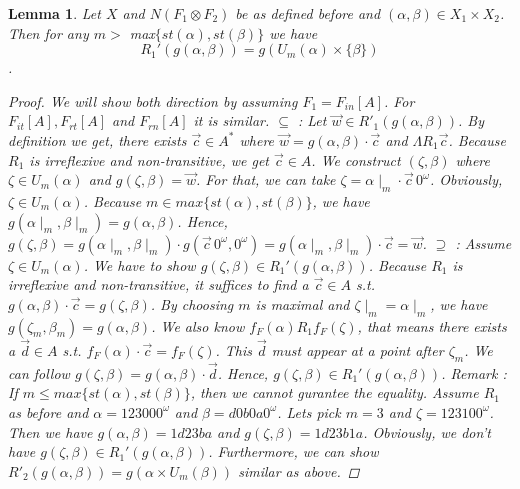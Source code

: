 \documentclass[12pt, a4paper]{scrartcl}
\newtheorem{lemma}[definition]{Lemma}
\begin{document}
\begin{lemma}
    Let $X$ and $N(F_1 \otimes F_2)$ be as defined before and $(\alpha,\beta) \in X_1 \times X_2$. Then for any $m >$ max$\{st(\alpha), st(\beta)\}$ we have 
    $$R_1'(g(\alpha,\beta)) = g(U_m(\alpha) \times \{\beta\})$$.
    

    \begin{proof}
        We will show both direction by assuming $F_1 = F_{in}[A]$. For $F_{it}[A],F_{rt}[A]$ and $F_{rn}[A]$ it is similar. \newline
        $\subseteq$ : Let $\vec{w} \in R'_1(g(\alpha,\beta))$. By definition we get, there exists $\vec{c} \in A^*$ where $\vec{w} = g(\alpha,\beta) \cdot \vec{c}$ and $\Lambda R_1 \vec{c}$.
        Because $R_1$ is irreflexive and non-transitive, we get $\vec{c} \in A$. We construct $(\zeta,\beta)$ where $\zeta \in U_m(\alpha)$ and $g(\zeta,\beta) = \vec{w}$. For that, we can take $\zeta = \alpha \mid_m \cdot \vec{c}\, 0^\omega$. Obviously, $\zeta \in U_m(\alpha)$.
        Because $m \in max\{st(\alpha), st(\beta)\}$, we have $g(\alpha \mid_m, \beta \mid_m) = g(\alpha, \beta)$. Hence, $g(\zeta, \beta) = g(\alpha \mid_m, \beta \mid_m) \cdot g(\vec{c} \,0^\omega, 0^\omega) = g(\alpha \mid_m, \beta \mid_m) \cdot \vec{c} = \vec{w}$.
        \newline \newline
        $\supseteq$ : Assume $\zeta \in U_m(\alpha)$. We have to show $g(\zeta, \beta) \in R_1'(g(\alpha, \beta))$. Because $R_1$ is irreflexive and non-transitive, it suffices to find a $\vec{c} \in A$ s.t. $g(\alpha,\beta) \cdot \vec{c} = g(\zeta, \beta)$.
        By choosing $m$ is maximal and $\zeta \mid_m = \alpha \mid_m$, we have $g(\zeta_m, \beta_m) = g(\alpha,\beta)$. We also know $f_F(\alpha)R_1 f_F(\zeta)$, that means there exists a $\vec{d} \in A$ s.t. $f_F(\alpha) \cdot \vec{c} = f_F(\zeta)$. This $\vec{d}$ must appear at a point after $\zeta_m$.
        We can follow $g(\zeta, \beta) = g(\alpha, \beta) \cdot \vec{d}$. Hence, $g(\zeta, \beta) \in R_1'(g(\alpha,\beta))$.
        \newline \newline
        Remark : If $m \leq max\{st(\alpha), st(\beta)\}$, then we cannot gurantee the equality. Assume $R_1$ as before and $\alpha = 123000^\omega$ and $\beta = d0b0a0^\omega$.
        Lets pick $m = 3$ and $\zeta = 123100^\omega$. Then we have $g(\alpha, \beta) = 1d23ba$ and $g(\zeta, \beta) = 1d23b1a$. Obviously, we don't have $g(\zeta, \beta) \in R_1'(g(\alpha,\beta))$. \newline
        Furthermore, we can show $R'_2(g(\alpha,\beta)) = g(\alpha \times U_m(\beta))$ similar as above. 
        
    \end{proof}


\end{lemma}
\end{document}
